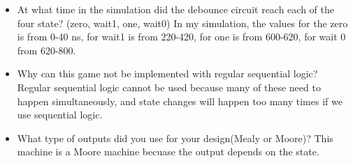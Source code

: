 \documentclass[11pt]{article}
\begin{document}
\begin{itemize}
	\item At what time in the simulation did the debounce circuit reach each of the four state? (zero, wait1, one, wait0)
	In my simulation, the values for the zero is from 0-40 ns, for wait1 is from 220-420, for one is from 600-620, for wait 0 from 620-800.
\end{itemize}
\begin{itemize}
	\item Why can this game not be implemented with regular sequential logic?
	Regular sequential logic cannot be used because many of these need to happen simultaneously, and state changes will happen too many times if we use sequential logic. 
\end{itemize}
\begin{itemize}
	\item What type of outputs did you use for your design(Mealy or Moore)?
	This machine is a Moore machine becuase the output depends on the state. 

\end{itemize}
\end{document}
